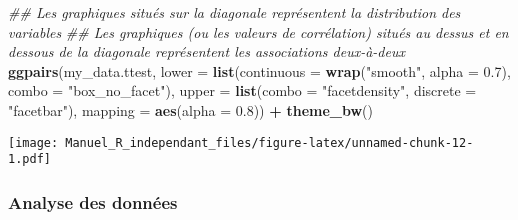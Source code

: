 \documentclass[
]{book}
\newenvironment{Shaded}{\begin{snugshade}}{\end{snugshade}}
\newcommand{\CommentTok}[1]{\textcolor[rgb]{0.56,0.35,0.01}{\textit{#1}}}
\newcommand{\DataTypeTok}[1]{\textcolor[rgb]{0.13,0.29,0.53}{#1}}
\newcommand{\FloatTok}[1]{\textcolor[rgb]{0.00,0.00,0.81}{#1}}
\newcommand{\KeywordTok}[1]{\textcolor[rgb]{0.13,0.29,0.53}{\textbf{#1}}}
\newcommand{\NormalTok}[1]{#1}
\newcommand{\OperatorTok}[1]{\textcolor[rgb]{0.81,0.36,0.00}{\textbf{#1}}}
\newcommand{\StringTok}[1]{\textcolor[rgb]{0.31,0.60,0.02}{#1}}
\begin{document}
\begin{Shaded}
\begin{Highlighting}[]
\CommentTok{## Les graphiques situés sur la diagonale représentent la distribution des variables}
\CommentTok{## Les graphiques (ou les valeurs de corrélation) situés au dessus et en dessous de la diagonale représentent les associations deux-à-deux}
\KeywordTok{ggpairs}\NormalTok{(my_data.ttest,}
        \DataTypeTok{lower =} \KeywordTok{list}\NormalTok{(}\DataTypeTok{continuous =} \KeywordTok{wrap}\NormalTok{(}\StringTok{"smooth"}\NormalTok{, }\DataTypeTok{alpha =} \FloatTok{0.7}\NormalTok{), }\DataTypeTok{combo =} \StringTok{"box_no_facet"}\NormalTok{),}
        \DataTypeTok{upper =} \KeywordTok{list}\NormalTok{(}\DataTypeTok{combo =} \StringTok{"facetdensity"}\NormalTok{, }\DataTypeTok{discrete =} \StringTok{"facetbar"}\NormalTok{), }
        \DataTypeTok{mapping =} \KeywordTok{aes}\NormalTok{(}\DataTypeTok{alpha =} \FloatTok{0.8}\NormalTok{)) }\OperatorTok{+}\StringTok{ }\KeywordTok{theme_bw}\NormalTok{()}
\end{Highlighting}
\end{Shaded}

\texttt{[image: Manuel\_R\_independant\_files/figure-latex/unnamed-chunk-12-1.pdf]}

\hypertarget{analyse-des-donnuxe9es}{%
\subsubsection{Analyse des données}\label{analyse-des-donnuxe9es}}
\end{document}
